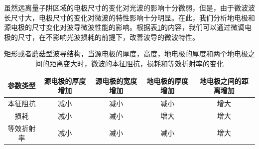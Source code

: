 虽然远离量子阱区域的电极尺寸的变化对光波的影响十分微弱，但是，由于微波波长尺寸大，电极尺寸的变化对微波的特性影响十分明显。在此，我们分析地电极和源电极的尺寸变化对波导微波性能的影响。根据表\ref{rect_metal_influence}的内容，我们可以通过微调电极的尺寸，在不影响光波损耗的前提下，改善波导的微波特性。	
{
	\begin{table}[htb]
		\caption{矩形或者蘑菇型波导结构，当源电极的厚度，高度，地电极的厚度和两个地电极之间的距离变大时，微波的本征阻抗，损耗和等效折射率的变化}
		\label{rect_metal_influence}
		\centering
		\begin{tabular}[t]{ccccc}
			\hline
			参数类型 &源电极的厚度增加 & 源电极的宽度增加 & 地电极的厚度增加& 地电极之间的距离增加 \\
			\hline
			本征阻抗 &   减小 & 减小 & 减小 &增大\\
			损耗  &   减小 & 减小 & 增大 &增大\\
			等效折射率 &  减小 & 减小 & 减小 &增大\\
			\hline
		\end{tabular}
	\end{table}
}

